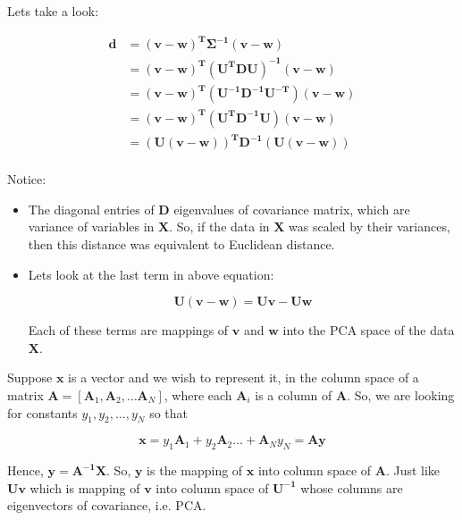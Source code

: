 \documentclass[12pt]{article}
\theoremstyle{plain}
\theoremstyle{definition}
\theoremstyle{definition}
\begin{document}
Lets take a look:

\begin{equation}\label{eq:equivalency}
\begin{aligned}
\mathbf{d} &= \mathbf{(v - w)^\text{T} \Sigma^{-1} (v - w)} \\
                 &= \mathbf{(v - w)^\text{T}  (U^\text{T} D U) ^{-1} (v - w)} \\
                 &= \mathbf{(v - w)^\text{T}  (U^{-1} D^{-1} U^{-T}) (v - w)} \\
                 &= \mathbf{(v - w)^\text{T}  (U^\text{T} D^{-1} U) (v - w)} \\
                 &= \mathbf{(U(v - w))^\text{T}  D^{-1} (U (v - w))} \\
\end{aligned}
\end{equation}

Notice:
\begin{itemize}
\item The diagonal entries of $\mathbf{D}$ eigenvalues of covariance matrix,
which are variance of variables in $\mathbf{X}$. So, if the data in $\mathbf{X}$
was scaled by their variances, then this distance was equivalent to
 Euclidean distance.

\item Lets look at the last term in above equation:

\begin{equation}
\mathbf{ U (v - w)}  = \mathbf{ U v} - \mathbf{ U w}
\end{equation}

Each of these terms are mappings of $\mathbf{v}$ and $\mathbf{w}$
into the PCA space of the data $\mathbf{X}$.
\end{itemize}


Suppose $\mathbf{x}$ is a vector and we wish to represent it, 
in the column space of a matrix $\mathbf{A} = [\mathbf{A}_1, \mathbf{A}_2, \dots \mathbf{A}_N]$,
where each $\mathbf{A}_i$ is a column of $\mathbf{A}$. So, we are looking for constants $y_1, y_2, \dots, y_N$ so that 

\[\mathbf{x} = y_1 \mathbf{A}_1 + y_2 \mathbf{A}_2 \dots + \mathbf{A}_N y_N = \mathbf{Ay} \]

Hence, $\mathbf{y = A^{-1} X}$. So, $\mathbf{y}$ is the mapping of $\mathbf{x}$ into column space of
$\mathbf{A}$. Just like $\mathbf{Uv}$ which is mapping of $\mathbf{v}$ into column space of $\mathbf{U^{-1}}$
whose columns are eigenvectors of covariance, i.e. PCA.

\iffalse
P.S. I had to choose where to put the exponent \{-1\} to indicate inverse of the matrices, 
whether to the left or right of  $\mathbf{\Sigma}$.
Either way would have made some parts easier, but some other parts harder to follow.\\


Now, the question is, when you mentioned M. Distance takes
care of scales and collinearity, where, in what context you learned that.
Did the context refer to this definition of distance as M. distance, 
or they were talking about the distance between a point and distribution?
\fi
\end{document}
